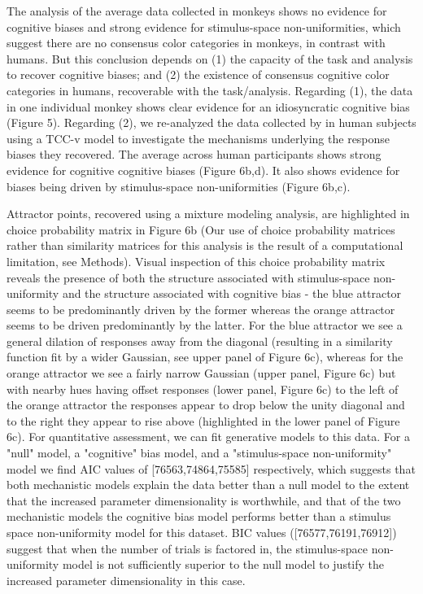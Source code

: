 \documentclass[9pt,biorxiv,lineno,onehalfspacing]{lapreprint}
\begin{document}
\begin{refsection}
The analysis of the average data collected in monkeys shows no evidence for cognitive biases and strong evidence for stimulus-space non-uniformities, which suggest there are no consensus color categories in monkeys, in contrast with humans. 
But this conclusion depends on (1) the capacity of the task and analysis to recover cognitive biases; and (2) the existence of consensus cognitive color categories in humans, recoverable with the task/analysis. 
Regarding (1), the data in one individual monkey shows clear evidence for an idiosyncratic cognitive bias (Figure 5). 
Regarding (2), we re-analyzed the data collected by \citet{bae_why_2015} in human subjects using a TCC-v model to investigate the mechanisms underlying the response biases they recovered. 
The average across human participants shows strong evidence for cognitive cognitive biases (Figure 6b,d). 
It also shows evidence for biases being driven by stimulus-space non-uniformities (Figure 6b,c).

Attractor points, recovered using a mixture modeling analysis, are highlighted in choice probability matrix in Figure 6b (Our use of choice probability matrices rather than similarity matrices for this analysis is the result of a computational limitation, see Methods).
Visual inspection of this choice probability matrix reveals the presence of both the structure associated with stimulus-space non-uniformity and the structure associated with cognitive bias - the blue attractor seems to be predominantly driven by the former whereas the orange attractor seems to be driven predominantly by the latter.
For the blue attractor we see a general dilation of responses away from the diagonal (resulting in a similarity function fit by a wider Gaussian, see upper panel of Figure 6c), whereas for the orange attractor we see a fairly narrow Gaussian (upper panel, Figure 6c) but with nearby hues having offset responses (lower panel, Figure 6c) to the left of the orange attractor the responses appear to drop below the unity diagonal and to the right they appear to rise above (highlighted in the lower panel of Figure 6c).
For quantitative assessment, we can fit generative models to this data. 
For a "null" model, a "cognitive" bias model, and a "stimulus-space non-uniformity" model we find AIC values of [76563,74864,75585] respectively, which suggests that both mechanistic models explain the data better than a null model to the extent that the increased parameter dimensionality is worthwhile, and that of the two mechanistic models the cognitive bias model performs better than a stimulus space non-uniformity model for this dataset.
BIC values ([76577,76191,76912]) suggest that when the number of trials is factored in, the stimulus-space non-uniformity model is not sufficiently superior to the null model to justify the increased parameter dimensionality in this case.


\end{refsection}
\end{document}
